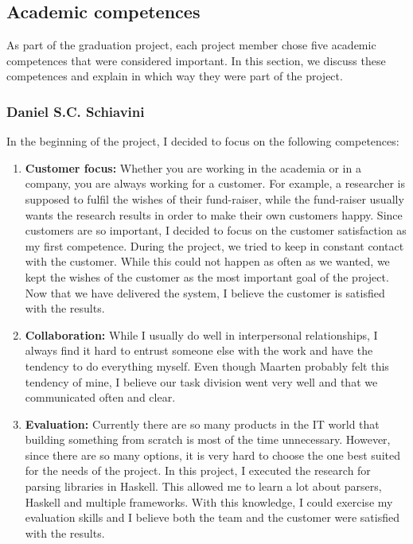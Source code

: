 
\subsection{Academic competences}
\label{assessment:competences}
As part of the graduation project, each project member chose five academic competences that were considered important.
In this section, we discuss these competences and explain in which way they were part of the project.

\subsubsection{Daniel S.C. Schiavini}
In the beginning of the project, I decided to focus on the following competences:
\begin{enumerate}
    \item \textbf{Customer focus:}
        Whether you are working in the academia or in a company, you are always working for a customer.
        For example, a researcher is supposed to fulfil the wishes of their fund-raiser, while the fund-raiser usually wants the research results in order to make their own customers happy.
        Since customers are so important, I decided to focus on the customer satisfaction as my first competence.
        During the project, we tried to keep in constant contact with the customer.
        While this could not happen as often as we wanted, we kept the wishes of the customer as the most important goal of the project.
        Now that we have delivered the system, I believe the customer is satisfied with the results.
        
    \item \textbf{Collaboration:}
        While I usually do well in interpersonal relationships, I always find it hard to entrust someone else with the work and have the tendency to do everything myself.
        Even though Maarten probably felt this tendency of mine, I believe our task division went very well and that we communicated often and clear.
    
    \item \textbf{Evaluation:}
        Currently there are so many products in the IT world that building something from scratch is most of the time unnecessary.
        However, since there are so many options, it is very hard to choose the one best suited for the needs of the project.
        In this project, I executed the research for parsing libraries in Haskell.
        This allowed me to learn a lot about parsers, Haskell and multiple frameworks.
        With this knowledge, I could exercise my evaluation skills and I believe both the team and the customer were satisfied with the results.
    

\end{enumerate}
